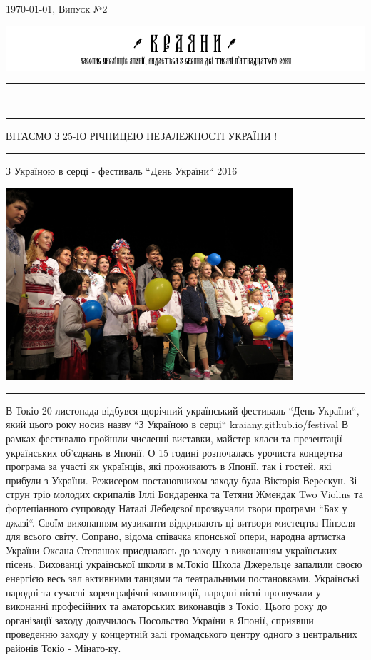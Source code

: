 \documentclass[10pt,a4paper]{article}
\newcommand{\HorRule}[1]{\noindent\rule{\linewidth}{#1}} %
\newcommand{\SepRule}{\noindent							 %
						\begin{center}
							\rule{250pt}{1pt}
						\end{center}
						}
\newcommand{\JournalIssue}[1]{%
		\hfill \textsc{\mydate \today, Випуск №2}
		\par \normalsize \normalfont}
\newcommand{\NewsItem}[1]{%
		\usefont{T2A}{iwona}{m}{n} 
		\large #1 \vspace{4pt}
		\par \normalsize \normalfont}
\begin{document}
\JournalIssue{1}
		\includegraphics[width=1\textwidth]{../common_files/chasopys_logo}
\noindent\HorRule{3pt} \\[-0.75\baselineskip]
\HorRule{1pt}

\begin{center}
ВІТАЄМО З 25-Ю РІЧНИЦЕЮ НЕЗАЛЕЖНОСТІ УКРАЇНИ !
\end{center}

\SepRule

\vspace{0.1cm}

\begin{center}
\NewsItem{З Україною в серці - фестиваль ``День України`` 2016}	
\includegraphics[width=0.8\textwidth]{images/18}
\end{center}
\SepRule	
\begin{multicols}{3}
В Токіо 20 листопада відбувся щорічний український фестиваль ``День України``, який цього року носив назву ``З Україною в серці`` kraiany.github.io/festival В рамках фестивалю пройшли численні виставки, майстер-класи та презентації українських об'єднань в Японії. О 15 годині розпочалась урочиста концертна програма за участі як українців, які проживають в Японії, так і гостей, які прибули з України. Режисером-постановником заходу була Вікторія Верескун. Зі струн тріо молодих скрипалів Іллі Бондаренка та Тетяни Жмендак Two Violins та фортепіанного супроводу Наталі Лебедєвої прозвучали твори програми ``Бах у джазі``. Своїм виконанням музиканти відкривають ці витвори мистецтва Пінзеля для всього світу. Сопрано, відома співачка японської опери, народна артистка України Оксана Степанюк приєдналась до заходу з виконанням українських пісень. Вихованці української школи в м.Токіо Школа Джерельце запалили своєю енергією весь зал активними танцями та театральними постановками. Українські народні та сучасні хореографічні композиції, народні пісні прозвучали у виконанні професійних та аматорських виконавців з Токіо. Цього року до організації заходу долучилось Посольство України в Японії, сприявши проведенню заходу у концертній залі громадського центру одного з центральних районів Токіо - Мінато-ку.
\end{multicols}
\end{document}
